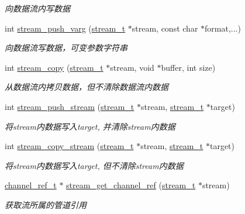 \begin{DoxyCompactItemize}
\begin{DoxyCompactList}\small\item\em 向数据流内写数据 \end{DoxyCompactList}\item 
int \hyperlink{a00107_ga9631c1d90e0fad04b6ad04ccc5b95808_ga9631c1d90e0fad04b6ad04ccc5b95808}{stream\+\_\+push\+\_\+varg} (\hyperlink{a00050_a261dba04f46f5c59a68a05f69f5a65a8_a261dba04f46f5c59a68a05f69f5a65a8}{stream\+\_\+t} $\ast$stream, const char $\ast$format,...)
\begin{DoxyCompactList}\small\item\em 向数据流写数据，可变参数字符串 \end{DoxyCompactList}\item 
int \hyperlink{a00107_ga380555bf71ee99f6b2bb4f76738d507f_ga380555bf71ee99f6b2bb4f76738d507f}{stream\+\_\+copy} (\hyperlink{a00050_a261dba04f46f5c59a68a05f69f5a65a8_a261dba04f46f5c59a68a05f69f5a65a8}{stream\+\_\+t} $\ast$stream, void $\ast$buffer, int size)
\begin{DoxyCompactList}\small\item\em 从数据流内拷贝数据，但不清除数据流内数据 \end{DoxyCompactList}\item 
int \hyperlink{a00107_gad5336c2b89b6edea5f277d5ebc221e15_gad5336c2b89b6edea5f277d5ebc221e15}{stream\+\_\+push\+\_\+stream} (\hyperlink{a00050_a261dba04f46f5c59a68a05f69f5a65a8_a261dba04f46f5c59a68a05f69f5a65a8}{stream\+\_\+t} $\ast$stream, \hyperlink{a00050_a261dba04f46f5c59a68a05f69f5a65a8_a261dba04f46f5c59a68a05f69f5a65a8}{stream\+\_\+t} $\ast$target)
\begin{DoxyCompactList}\small\item\em 将stream内数据写入target, 并清除stream内数据 \end{DoxyCompactList}\item 
int \hyperlink{a00107_ga296aea89ba5bec6566e119855df3b18c_ga296aea89ba5bec6566e119855df3b18c}{stream\+\_\+copy\+\_\+stream} (\hyperlink{a00050_a261dba04f46f5c59a68a05f69f5a65a8_a261dba04f46f5c59a68a05f69f5a65a8}{stream\+\_\+t} $\ast$stream, \hyperlink{a00050_a261dba04f46f5c59a68a05f69f5a65a8_a261dba04f46f5c59a68a05f69f5a65a8}{stream\+\_\+t} $\ast$target)
\begin{DoxyCompactList}\small\item\em 将stream内数据写入target, 但不清除stream内数据 \end{DoxyCompactList}\item 
\hyperlink{a00050_a151271c9d188ef28d4d24bb81dcc1263_a151271c9d188ef28d4d24bb81dcc1263}{channel\+\_\+ref\+\_\+t} $\ast$ \hyperlink{a00107_gab4b3e49d2c44a601e8bb7f568577fae4_gab4b3e49d2c44a601e8bb7f568577fae4}{stream\+\_\+get\+\_\+channel\+\_\+ref} (\hyperlink{a00050_a261dba04f46f5c59a68a05f69f5a65a8_a261dba04f46f5c59a68a05f69f5a65a8}{stream\+\_\+t} $\ast$stream)
\begin{DoxyCompactList}\small\item\em 获取流所属的管道引用 \end{DoxyCompactList}\end{DoxyCompactItemize}


